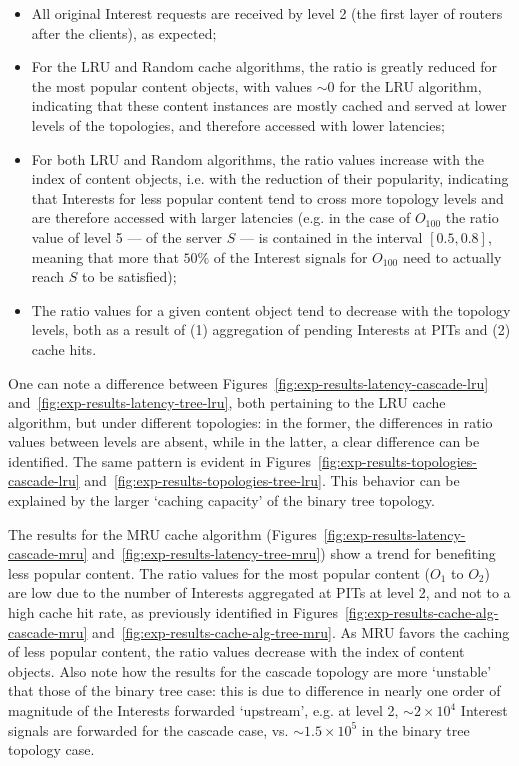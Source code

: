 \begin{itemize}
    \item All original Interest requests are 
        received by level 2 (the first layer of routers after the clients), as expected;
    \item For the LRU and Random cache algorithms, the ratio is greatly reduced for 
        the most popular content objects, with values $\sim0$ for the LRU algorithm, 
        indicating that these content instances are mostly cached and served at 
        lower levels of the topologies, and therefore accessed with lower latencies;
    \item For both LRU and Random algorithms, the ratio values increase with the index of 
        content objects, i.e. with the reduction of their popularity, indicating that 
        Interests for less popular content tend to cross more topology levels and 
        are therefore accessed with larger latencies (e.g. in the case of $O_{100}$ 
        the ratio value of level 5 --- of the server $S$ --- is contained in the 
        interval $[0.5, 0.8]$, meaning 
        that more that $50\%$ of the Interest signals for $O_{100}$ need to actually 
        reach $S$ to be satisfied);
    \item The ratio values for a given content object tend to decrease with the topology 
        levels, both as a result of (1) aggregation of pending Interests at PITs and 
        (2) cache hits.
\end{itemize}\shortvertbreak

One can note a difference between Figures~\ref{fig:exp-results-latency-cascade-lru} 
and~\ref{fig:exp-results-latency-tree-lru}, both pertaining to the LRU cache 
algorithm, but under different topologies: in the former, the differences in 
ratio values between levels are absent, while in the latter, a clear difference 
can be identified. The same pattern is evident in 
Figures~\ref{fig:exp-results-topologies-cascade-lru} and~\ref{fig:exp-results-topologies-tree-lru}. 
This behavior can be explained by the larger `caching capacity' of the binary 
tree topology.\shortvertbreak

The results for the MRU cache algorithm (Figures~\ref{fig:exp-results-latency-cascade-mru} 
and~\ref{fig:exp-results-latency-tree-mru}) show a trend for benefiting less 
popular content. The ratio values for the 
most popular content ($O_1$ to $O_2$) are low due to the number of Interests aggregated 
at PITs at level 2, and not to a high cache hit rate, as previously identified in Figures~\ref{fig:exp-results-cache-alg-cascade-mru} 
and~\ref{fig:exp-results-cache-alg-tree-mru}. As MRU favors the caching of less popular 
content, the ratio values decrease with the index of content objects. Also note how the 
results for the cascade topology are more `unstable' that those of the binary 
tree case: this is due to difference in nearly one order of magnitude of the 
Interests forwarded `upstream', e.g. at level 2, $\sim2 \times 10^4$ Interest signals 
are forwarded for the cascade case, vs. $\sim1.5 \times 10^5$ in the binary 
tree topology case.\shortvertbreak

